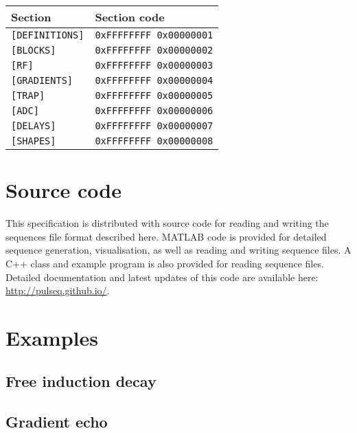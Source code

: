 \documentclass{article}
\begin{document}
\begin{center}
\begin{tabular}{ll}
\toprule
Section & Section code \\
\midrule
\verb.[DEFINITIONS]. & \verb.0xFFFFFFFF 0x00000001. \\
\verb.[BLOCKS]. & \verb.0xFFFFFFFF 0x00000002. \\
\verb.[RF]. & \verb.0xFFFFFFFF 0x00000003. \\
\verb.[GRADIENTS]. & \verb.0xFFFFFFFF 0x00000004. \\
\verb.[TRAP]. & \verb.0xFFFFFFFF 0x00000005. \\
\verb.[ADC]. & \verb.0xFFFFFFFF 0x00000006. \\
\verb.[DELAYS]. & \verb.0xFFFFFFFF 0x00000007. \\
\verb.[SHAPES]. & \verb.0xFFFFFFFF 0x00000008. \\
\bottomrule
\end{tabular}
\end{center}

\section{Source code}
This specification is distributed with source code for reading and writing the sequences file format described here. MATLAB code is provided for detailed sequence generation, visualisation, as well as reading and writing sequence files. A C++ class and example program is also provided for reading sequence files. Detailed documentation and latest updates of this code are available here: \url{http://pulseq.github.io/}.

\newpage
\section{Examples}

\subsection{Free induction decay}



\subsection{Gradient echo}


\end{document}
